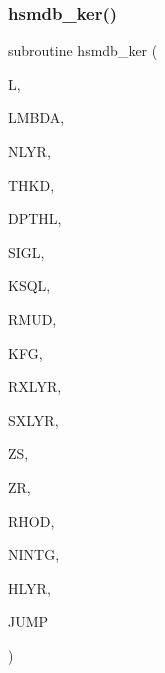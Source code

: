 \subsubsection{\texorpdfstring{hsmdb\+\_\+ker()}{hsmdb\_ker()}}
{\footnotesize\ttfamily subroutine hsmdb\+\_\+ker (\begin{DoxyParamCaption}\item[{integer}]{L,  }\item[{real(kind=ql)}]{L\+M\+B\+DA,  }\item[{integer}]{N\+L\+YR,  }\item[{real(kind=ql), dimension (nlyr)}]{T\+H\+KD,  }\item[{real(kind=ql), dimension (nlyr)}]{D\+P\+T\+HL,  }\item[{complex(kind=ql), dimension(nlyr)}]{S\+I\+GL,  }\item[{complex(kind=ql), dimension(nlyr)}]{K\+S\+QL,  }\item[{real(kind=ql), dimension(0\+:nlyr)}]{R\+M\+UD,  }\item[{integer}]{K\+FG,  }\item[{integer}]{R\+X\+L\+YR,  }\item[{integer}]{S\+X\+L\+YR,  }\item[{real(kind=ql)}]{ZS,  }\item[{real(kind=ql)}]{ZR,  }\item[{real(kind=ql)}]{R\+H\+OD,  }\item[{integer}]{N\+I\+N\+TG,  }\item[{complex(kind=ql), dimension(nintg)}]{H\+L\+YR,  }\item[{logical}]{J\+U\+MP }\end{DoxyParamCaption})}

